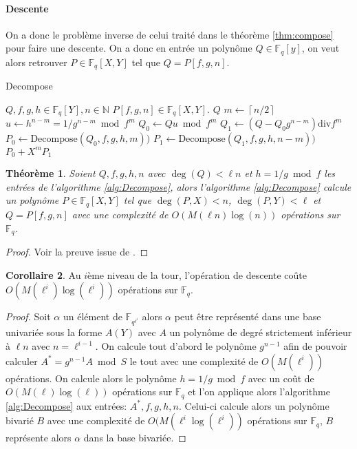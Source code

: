 \documentclass[10pt,a4paper]{book}
\theoremstyle{plain}
\newtheorem{thm}{Théorème}[chapter]
\theoremstyle{definition}
\theoremstyle{definition}
\newtheorem{cor}[thm]{Corollaire}
\theoremstyle{definition}
\theoremstyle{definition}
\theoremstyle{remark}
\theoremstyle{remark}
\theoremstyle{definition}
\begin{document}
\paragraph{Descente}
On a donc le problème inverse de celui traité dans le théorème \ref{thm:compose} pour faire une descente. On a donc en entrée un polynôme $Q \in \mathbb{F}_q[y]$, on veut alors retrouver $P\in \mathbb{F}_q[X,Y]$ tel que $Q=P[f,g,n]$. 
\begin{algorithm}
\caption{\label{alg:Decompose}Decompose}
\begin{algorithmic}[1]
\REQUIRE $Q,f,g,h \in \mathbb{F}_q[Y], n \in \mathbb{N}$
\ENSURE $P[f,g,n] \in \mathbb{F}_q[X,Y]$.
 \RETURN $Q$
\ELSE
\STATE $m \gets \left\lceil n/2 \right\rceil   $
\STATE $u \gets h^{n-m}=1/g^{n-m} \bmod f^m$
\STATE $Q_0 \gets Qu \bmod f^m$
\STATE $Q_1 \gets (Q-Q_0g^{n-m}) \mathrm{div} f^m$
\STATE $P_0 \gets \textrm{Decompose}(Q_0,f,g,h,m))$
\STATE $P_1 \gets \textrm{Decompose}(Q_1,f,g,h,n-m))$
\RETURN $P_0 + X^mP_1$ 
\ENDIF
\end{algorithmic}
\end{algorithm}

\begin{thm}
Soient $Q,f,g,h,n$ avec $\deg(Q)<\ell n$ et $h=1/g \bmod f$ les entrées de l'algorithme \ref{alg:Decompose}, alors l'algorithme \ref{alg:Decompose} calcule un polynôme $P \in \mathbb{F}_q[X,Y]$ tel que $\deg(P,X)<n$, $\deg(P,Y)<\ell$ et $Q=P[f,g,n]$ avec une complexité de $O(M(\ell n) \log(n))$ opérations sur $\mathbb{F}_q$.
\end{thm}

\begin{proof}
Voir la preuve issue de \cite{DeFeo-Doliskani-Schost13}.
\end{proof}

\begin{cor}
Au $i$ème niveau de la tour, l'opération de descente coûte $O(M(\ell^i)\log(\ell^i))$ opérations sur $\mathbb{F}_q$.
\end{cor}

\begin{proof}
Soit $\alpha$ un élément de $\mathbb{F}_{q^{\ell^i}}$ alors $\alpha$ peut être représenté dans une base univariée sous la forme $A(Y)$ avec $A$ un polynôme de degré strictement inférieur à $\ell n $ avec $n=\ell^{i-1}$. On calcule tout d'abord le polynôme $g^{n-1}$ afin de pouvoir calculer $A^*=g^{n-1}A \bmod S$ le tout avec une complexité de $O(M(\ell^i))$ opérations. On calcule alors le polynôme $h=1/g \bmod f$ avec un coût de $O(M(\ell)\log(\ell))$ opérations sur $\mathbb{F}_q$ et l'on applique alors l'algorithme \ref{alg:Decompose} aux entrées: $A^*,f,g,h,n$. Celui-ci calcule alors un polynôme bivarié $B$ avec une complexité de $O(M(\ell^i\log(\ell^i))$ opérations sur $\mathbb{F}_q$, $B$ représente alors $\alpha$ dans la base bivariée.
\end{proof}
\end{document}
